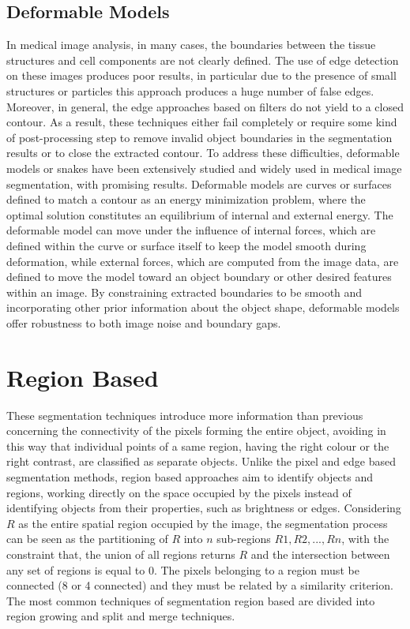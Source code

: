 \documentclass[final,a4paper,12pt,english]{UnicaPhdThesis3}
\begin{document}
	\subsection{Deformable Models} %
	In medical image analysis, in many cases, the boundaries between the tissue structures and cell components are not clearly defined. The use of edge detection on these images produces poor results, in particular due to the presence of small structures or particles this approach produces a huge number of false edges. Moreover, in general, the edge approaches based on filters do not yield to a closed contour. As a result, these techniques either fail completely or require some kind of post-processing step to remove invalid object boundaries in the segmentation results or to close the extracted contour. To address these difficulties, deformable models or snakes \cite{Kass} have been extensively studied and widely used in medical image segmentation, with promising results. Deformable models are curves or surfaces defined to match a contour as an energy minimization problem, where the optimal solution constitutes an equilibrium of internal and external energy. The deformable model can move under the influence of internal forces, which are defined within the curve or surface itself to keep the model smooth during deformation, while external forces, which are computed from the image data, are defined to move the model toward an object boundary or other desired features within an image. By constraining extracted boundaries to be smooth and incorporating other prior information about the object shape, deformable models offer robustness to both image noise and boundary gaps.
	
	\section{Region Based} %
	These segmentation techniques introduce more information than previous concerning the connectivity of the pixels forming the entire object, avoiding in this way that individual points of a same region, having the right colour or the right contrast, are classified as separate objects. Unlike the pixel and edge based segmentation methods, region based approaches aim to identify objects and regions, working directly on the space occupied by the pixels instead of identifying objects from their properties, such as brightness or edges. Considering $R$ as the entire spatial region occupied by the image, the segmentation process can be seen as the partitioning of $R$ into $n$ sub-regions $R1, R2, ..., Rn$, with the constraint that, the union of all regions returns $R$ and the intersection between any set of regions is equal to $0$. The pixels belonging to a region must be connected (8 or 4 connected) and they must be related by a similarity criterion. The most common techniques of segmentation region based are divided into region growing and split and merge techniques.
	
\end{document}
